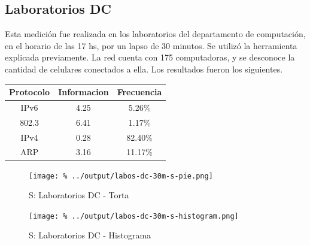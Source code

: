 \documentclass[final,inline,a4paper,narroweqnarray]{ieee}
\begin{document}
  \subsection{Laboratorios DC}

    Esta medición fue realizada en los laboratorios del departamento de
    computación, en el horario de las 17 hs, por un lapso de 30 minutos.
    Se utilizó la herramienta explicada previamente. La red cuenta con 175
    computadoras, y se desconoce la cantidad de celulares conectados a ella.
    Los resultados fueron los siguientes.
  
\begin{table}\begin{center}
    \begin{tabular}{|c|c|c|}
    \hline
    Protocolo & Informacion & Frecuencia \\ \hline
    IPv6      & 4.25        & 5.26\%     \\ \hline
    802.3     & 6.41        & 1.17\%     \\ \hline
    IPv4      & 0.28        & 82.40\%    \\ \hline
    ARP       & 3.16        & 11.17\%    \\ \hline
    \end{tabular}
\end{center}\end{table}

	
 
    \begin{figure}[ht]\begin{center}
      \texttt{[image: \%
      ../output/labos-dc-30m-s-pie.png]}
      \vspace{-3em}
      \caption{S: Laboratorios DC - Torta}
      \label{labos-dc-30m-s-pie}
    \end{center}\end{figure}

    \begin{figure}[ht]\begin{center}
      \texttt{[image: \%
      ../output/labos-dc-30m-s-histogram.png]}
      \caption{S: Laboratorios DC - Histograma}
      \label{labos-dc-30m-s-histogram}
    \end{center}\end{figure}
\end{document}
